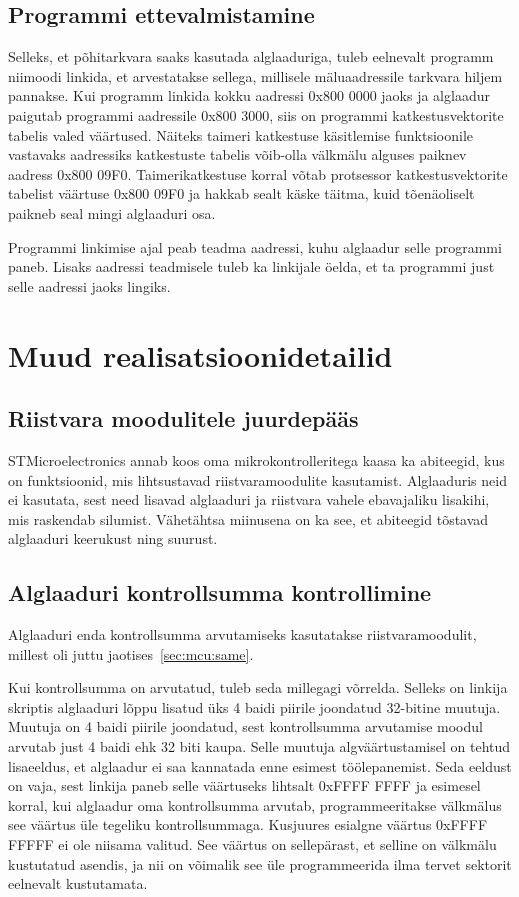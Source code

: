 \documentclass[12pt,a4paper]{article}
\begin{document}
\subsection{Programmi ettevalmistamine}
\label{sec:boot:prep}
Selleks, et põhitarkvara saaks kasutada alglaaduriga, tuleb eelnevalt programm
niimoodi linkida, et arvestatakse sellega, millisele mäluaadressile tarkvara
hiljem pannakse. Kui programm linkida kokku aadressi 0x800 0000 jaoks ja
alglaadur paigutab programmi aadressile 0x800 3000, siis on programmi
katkestusvektorite tabelis valed väärtused. Näiteks taimeri katkestuse
käsitlemise funktsioonile vastavaks aadressiks katkestuste tabelis võib-olla
välkmälu alguses paiknev aadress 0x800 09F0. Taimerikatkestuse korral võtab
protsessor katkestusvektorite tabelist väärtuse 0x800 09F0 ja hakkab sealt käske
täitma, kuid tõenäoliselt paikneb seal mingi alglaaduri osa.

Programmi linkimise ajal peab teadma aadressi, kuhu alglaadur selle programmi
paneb. Lisaks aadressi teadmisele tuleb ka linkijale öelda, et ta programmi just
selle aadressi jaoks lingiks.

\section{Muud realisatsioonidetailid}
\subsection{Riistvara moodulitele juurdepääs}
STMicroelectronics annab koos oma mikrokontrolleritega kaasa ka abiteegid, kus
on funktsioonid, mis lihtsustavad riistvaramoodulite kasutamist. Alglaaduris neid
ei kasutata, sest need lisavad alglaaduri ja riistvara vahele ebavajaliku
lisakihi, mis raskendab silumist. Vähetähtsa miinusena on ka see, et abiteegid
tõstavad alglaaduri keerukust ning suurust.

\subsection{Alglaaduri kontrollsumma kontrollimine}
Alglaaduri enda kontrollsumma arvutamiseks kasutatakse riistvaramoodulit,
millest oli juttu jaotises~\ref{sec:mcu:same}.

Kui kontrollsumma on arvutatud, tuleb seda millegagi võrrelda. Selleks on
linkija skriptis alglaaduri lõppu lisatud üks 4 baidi piirile joondatud
32-bitine muutuja. Muutuja on 4 baidi piirile joondatud, sest kontrollsumma
arvutamise moodul arvutab just 4 baidi ehk 32 biti kaupa. Selle muutuja
algväärtustamisel on tehtud lisaeeldus, et alglaadur ei saa kannatada enne
esimest töölepanemist. Seda eeldust on vaja, sest linkija paneb selle väärtuseks
lihtsalt 0xFFFF FFFF ja esimesel korral, kui alglaadur oma kontrollsumma
arvutab, programmeeritakse välkmälus see väärtus üle tegeliku kontrollsummaga.
Kusjuures esialgne väärtus 0xFFFF FFFFF ei ole niisama valitud. See väärtus on
sellepärast, et selline on välkmälu kustutatud asendis, ja nii on võimalik see
üle programmeerida ilma tervet sektorit eelnevalt kustutamata.
\end{document}
